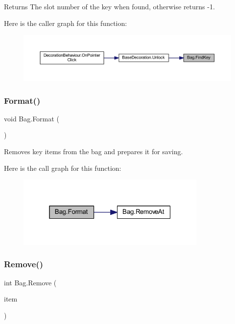 \begin{DoxyReturn}{Returns}
The slot number of the key when found, otherwise returns -\/1.
\end{DoxyReturn}
Here is the caller graph for this function\+:\nopagebreak
\begin{figure}[H]
\begin{center}
\leavevmode
\includegraphics[width=350pt]{class_bag_ab913ca67bac7d4a740a470dbb1632311_icgraph}
\end{center}
\end{figure}
\mbox{\label{class_bag_a3ee41396e25179a9c975c6f90d601bdd}} 
\subsubsection{\texorpdfstring{Format()}{Format()}}
{\footnotesize\ttfamily void Bag.\+Format (\begin{DoxyParamCaption}{ }\end{DoxyParamCaption})}



Removes key items from the bag and prepares it for saving. 

Here is the call graph for this function\+:
\nopagebreak
\begin{figure}[H]
\begin{center}
\leavevmode
\includegraphics[width=265pt]{class_bag_a3ee41396e25179a9c975c6f90d601bdd_cgraph}
\end{center}
\end{figure}
\mbox{\label{class_bag_a42a4319aa14d0b6bda7f91070ba57a47}} 
\subsubsection{\texorpdfstring{Remove()}{Remove()}}
{\footnotesize\ttfamily int Bag.\+Remove (\begin{DoxyParamCaption}\item[{\mbox{\hyperlink{class_base_item}{Base\+Item}}}]{item }\end{DoxyParamCaption})}



